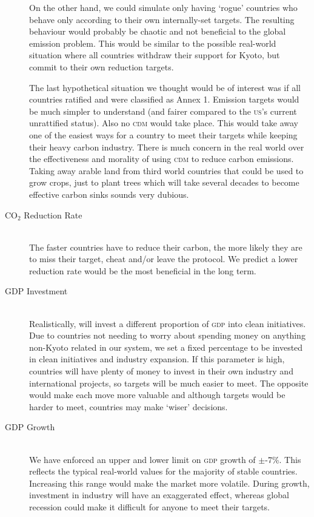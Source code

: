 \begin{description}
On the other hand, we could simulate only having `rogue' countries who behave only according to their own internally-set targets. The resulting behaviour would probably be chaotic and not beneficial to the global emission problem. This would be similar to the possible real-world situation where all countries withdraw their support for Kyoto, but commit to their own reduction targets.

The last hypothetical situation we thought would be of interest was if all countries ratified and were classified as Annex 1. Emission targets would be much simpler to understand (and fairer compared to the \textsc{us}'s current unrattified status). Also no \textsc{cdm} would take place. This would take away one of the easiest ways for a country to meet their targets while keeping their heavy carbon industry. There is much concern in the real world over the effectiveness and morality of using \textsc{cdm} to reduce carbon emissions. Taking away arable land from third world countries that could be used to grow crops, just to plant trees which will take several decades to become effective carbon sinks sounds very dubious.

\item[CO$_2$ Reduction Rate] \hfill \\

The faster countries have to reduce their carbon, the more likely they are to miss their target, cheat and/or leave the protocol. We predict a lower reduction rate would be the most beneficial in the long term.

\item[GDP Investment] \hfill \\

Realistically, will invest a different proportion of \textsc{gdp} into clean initiatives. Due to countries not needing to worry about spending money on anything non-Kyoto related in our system, we set a fixed percentage to be invested in clean initiatives and industry expansion. If this parameter is high, countries will have plenty of money to invest in their own industry and international projects, so targets will be much easier to meet. The opposite would make each move more valuable and although targets would be harder to meet, countries may make `wiser' decisions.

\item[GDP Growth] \hfill \\

We have enforced an upper and lower limit on \textsc{gdp} growth of $\pm$-7\%. This reflects the typical real-world values for the majority of stable countries. Increasing this range would make the market more volatile. During growth, investment in industry will have an exaggerated effect, whereas global recession could make it difficult for anyone to meet their targets.


\end{description}
